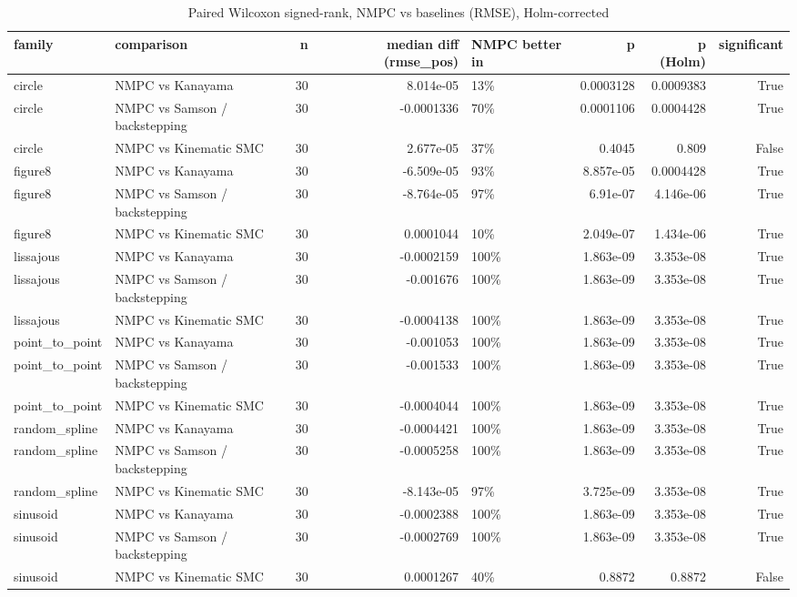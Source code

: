 \begin{table}
\caption{Paired Wilcoxon signed-rank, NMPC vs baselines (RMSE), Holm-corrected}
\label{tab:tracking_wilcoxon}
\begin{tabular}{llrrlrrr}
\toprule
family & comparison & n & median diff (rmse\_pos) & NMPC better in & p & p (Holm) & significant \\
\midrule
circle & NMPC vs Kanayama & 30 & 8.014e-05 & 13\% & 0.0003128 & 0.0009383 & True \\
circle & NMPC vs Samson / backstepping & 30 & -0.0001336 & 70\% & 0.0001106 & 0.0004428 & True \\
circle & NMPC vs Kinematic SMC & 30 & 2.677e-05 & 37\% & 0.4045 & 0.809 & False \\
figure8 & NMPC vs Kanayama & 30 & -6.509e-05 & 93\% & 8.857e-05 & 0.0004428 & True \\
figure8 & NMPC vs Samson / backstepping & 30 & -8.764e-05 & 97\% & 6.91e-07 & 4.146e-06 & True \\
figure8 & NMPC vs Kinematic SMC & 30 & 0.0001044 & 10\% & 2.049e-07 & 1.434e-06 & True \\
lissajous & NMPC vs Kanayama & 30 & -0.0002159 & 100\% & 1.863e-09 & 3.353e-08 & True \\
lissajous & NMPC vs Samson / backstepping & 30 & -0.001676 & 100\% & 1.863e-09 & 3.353e-08 & True \\
lissajous & NMPC vs Kinematic SMC & 30 & -0.0004138 & 100\% & 1.863e-09 & 3.353e-08 & True \\
point\_to\_point & NMPC vs Kanayama & 30 & -0.001053 & 100\% & 1.863e-09 & 3.353e-08 & True \\
point\_to\_point & NMPC vs Samson / backstepping & 30 & -0.001533 & 100\% & 1.863e-09 & 3.353e-08 & True \\
point\_to\_point & NMPC vs Kinematic SMC & 30 & -0.0004044 & 100\% & 1.863e-09 & 3.353e-08 & True \\
random\_spline & NMPC vs Kanayama & 30 & -0.0004421 & 100\% & 1.863e-09 & 3.353e-08 & True \\
random\_spline & NMPC vs Samson / backstepping & 30 & -0.0005258 & 100\% & 1.863e-09 & 3.353e-08 & True \\
random\_spline & NMPC vs Kinematic SMC & 30 & -8.143e-05 & 97\% & 3.725e-09 & 3.353e-08 & True \\
sinusoid & NMPC vs Kanayama & 30 & -0.0002388 & 100\% & 1.863e-09 & 3.353e-08 & True \\
sinusoid & NMPC vs Samson / backstepping & 30 & -0.0002769 & 100\% & 1.863e-09 & 3.353e-08 & True \\
sinusoid & NMPC vs Kinematic SMC & 30 & 0.0001267 & 40\% & 0.8872 & 0.8872 & False \\
\bottomrule
\end{tabular}
\end{table}
